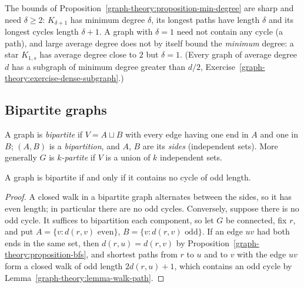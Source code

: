 \begin{counterexample}\label{graph-theory:counterexample-min-degree}
The bounds of Proposition~\ref{graph-theory:proposition-min-degree} are sharp and need $\delta \geq 2$: $K_{\delta+1}$ has minimum degree $\delta$, its longest paths have length $\delta$ and its
longest cycles length $\delta + 1$. A graph with $\delta = 1$ need not contain any cycle (a path), and large average degree does not by itself bound the \emph{minimum} degree: a star $K_{1,s}$ has
average degree close to $2$ but $\delta = 1$. (Every graph of average degree $d$ has a subgraph of minimum degree greater than $d/2$, Exercise~\ref{graph-theory:exercise-dense-subgraph}.)
\end{counterexample}

\subsection{Bipartite graphs}\label{graph-theory:subsection-bipartite}

\begin{definition}\label{graph-theory:definition-bipartite}
A graph is \emph{bipartite} if $V = A \sqcup B$ with every edge having one end in $A$ and one in $B$; $(A, B)$ is a \emph{bipartition}, and $A$, $B$ are its \emph{sides} (independent sets).
More generally $G$ is \emph{$k$-partite} if $V$ is a union of $k$ independent sets.
\end{definition}

\begin{proposition}[K\"onig]\label{graph-theory:proposition-bipartite}
A graph is bipartite if and only if it contains no cycle of odd length.
\end{proposition}

\begin{proof}
A closed walk in a bipartite graph alternates between the sides, so it has even length; in particular there are no odd cycles. Conversely, suppose there is no odd cycle. It suffices to
bipartition each component, so let $G$ be connected, fix $r$, and put $A = \{v : d(r, v) \text{ even}\}$, $B = \{v : d(r, v) \text{ odd}\}$. If an edge $uv$ had both ends in the same set, then
$d(r, u) = d(r, v)$ by Proposition~\ref{graph-theory:proposition-bfs}, and shortest paths from $r$ to $u$ and to $v$ with the edge $uv$ form a closed walk of odd length $2d(r, u) + 1$, which
contains an odd cycle by Lemma~\ref{graph-theory:lemma-walk-path}.
\end{proof}

